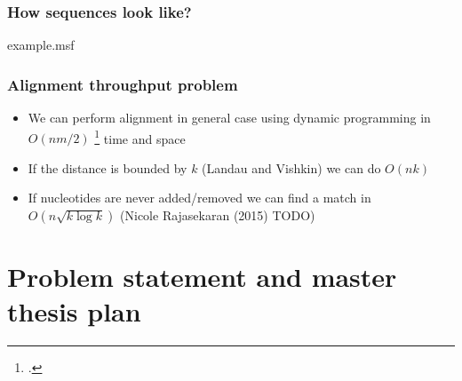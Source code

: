 {
\begin{frame}[fragile]
  \frametitle{How sequences look like?}
  \begin{texshade}{example.msf}
     
    \hidenumbering
    \showlegend
  \end{texshade}
\end{frame}
}

\begin{frame}[fragile]
  \frametitle{Alignment throughput problem}
  \begin{itemize}
    \item We can perform alignment in general case using dynamic programming in $O(nm/2)$ \footcite{ncbi_lecture_pairwise_alignment} time and space 
    \item If the distance is bounded by $k$ (Landau and Vishkin) we can do $O(nk)$
    \item If nucleotides are never added/removed we can find a match in $O(n \sqrt{k \log k})$ (Nicole Rajasekaran (2015) TODO)
  \end{itemize}
\end{frame}


\section{Problem statement and master thesis plan}

